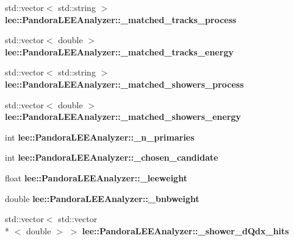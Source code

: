 \begin{DoxyCompactItemize}
\item 
\hypertarget{group__lee_gaf01f5331ecedef37034b5e8a12aac314}{std\-::vector$<$ std\-::string $>$ {\bfseries lee\-::\-Pandora\-L\-E\-E\-Analyzer\-::\-\_\-matched\-\_\-tracks\-\_\-process}}\label{group__lee_gaf01f5331ecedef37034b5e8a12aac314}

\item 
\hypertarget{group__lee_ga3cd167b0e0e259df8c58bed1190edd85}{std\-::vector$<$ double $>$ {\bfseries lee\-::\-Pandora\-L\-E\-E\-Analyzer\-::\-\_\-matched\-\_\-tracks\-\_\-energy}}\label{group__lee_ga3cd167b0e0e259df8c58bed1190edd85}

\item 
\hypertarget{group__lee_ga68fdfb9878716c7d99651a98e294818d}{std\-::vector$<$ std\-::string $>$ {\bfseries lee\-::\-Pandora\-L\-E\-E\-Analyzer\-::\-\_\-matched\-\_\-showers\-\_\-process}}\label{group__lee_ga68fdfb9878716c7d99651a98e294818d}

\item 
\hypertarget{group__lee_ga8c616d054941206de6a91e7859ac4209}{std\-::vector$<$ double $>$ {\bfseries lee\-::\-Pandora\-L\-E\-E\-Analyzer\-::\-\_\-matched\-\_\-showers\-\_\-energy}}\label{group__lee_ga8c616d054941206de6a91e7859ac4209}

\item 
\hypertarget{group__lee_ga9cb9605f2fe0af2464f936651659ad91}{int {\bfseries lee\-::\-Pandora\-L\-E\-E\-Analyzer\-::\-\_\-n\-\_\-primaries}}\label{group__lee_ga9cb9605f2fe0af2464f936651659ad91}

\item 
\hypertarget{group__lee_ga258cdf1c3fb847abc6f3aad95f8471d0}{int {\bfseries lee\-::\-Pandora\-L\-E\-E\-Analyzer\-::\-\_\-chosen\-\_\-candidate}}\label{group__lee_ga258cdf1c3fb847abc6f3aad95f8471d0}

\item 
\hypertarget{group__lee_gaeba6b9ecae9a1616394a17189dfe4808}{float {\bfseries lee\-::\-Pandora\-L\-E\-E\-Analyzer\-::\-\_\-leeweight}}\label{group__lee_gaeba6b9ecae9a1616394a17189dfe4808}

\item 
\hypertarget{group__lee_ga9450f1c2fbd4efa3927094f9953c5041}{double {\bfseries lee\-::\-Pandora\-L\-E\-E\-Analyzer\-::\-\_\-bnbweight}}\label{group__lee_ga9450f1c2fbd4efa3927094f9953c5041}

\item 
\hypertarget{group__lee_gaa6b9f1a06dcc4c9b5e7ad66b2a5f3995}{std\-::vector$<$ std\-::vector\\*
$<$ double $>$ $>$ {\bfseries lee\-::\-Pandora\-L\-E\-E\-Analyzer\-::\-\_\-shower\-\_\-d\-Qdx\-\_\-hits}}\label{group__lee_gaa6b9f1a06dcc4c9b5e7ad66b2a5f3995}


\end{DoxyCompactItemize}
